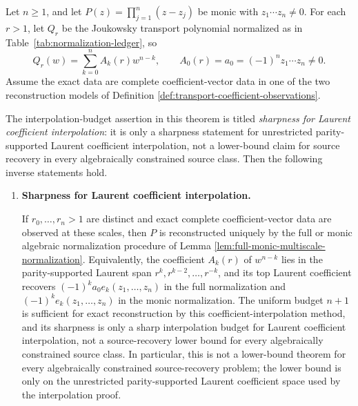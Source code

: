 \begin{theorem}\label{thm:algebraic-mahler-transport-inverse}
Let \(n\ge1\), and let \(P(z)=\prod_{j=1}^{n}(z-z_j)\) be monic with \(z_1\cdots z_n\ne0\).  For each \(r>1\), let \(Q_r\) be the Joukowsky transport polynomial normalized as in Table~\ref{tab:normalization-ledger}, so
\[
Q_r(w)=\sum_{k=0}^{n}A_k(r)w^{n-k},
\qquad
A_0(r)=a_0=(-1)^n z_1\cdots z_n\ne0.
\]
Assume the exact data are complete coefficient-vector data in one of the
two reconstruction models of Definition
\ref{def:transport-coefficient-observations}.

The interpolation-budget assertion in this theorem is titled
\emph{sharpness for Laurent coefficient interpolation}: it is only a
sharpness statement for unrestricted parity-supported Laurent coefficient
interpolation, not a lower-bound claim for source recovery in every
algebraically constrained source class.  Then the following inverse
statements hold.
\begin{enumerate}[label=\textup{(\roman*)}]
  \item \leavevmode\par\noindent\textbf{Sharpness for Laurent coefficient interpolation.}

  If \(r_0,\dots,r_n>1\) are distinct and exact complete coefficient-vector data are observed at these scales, then \(P\) is reconstructed uniquely by the full or monic algebraic normalization procedure of Lemma \ref{lem:full-monic-multiscale-normalization}.  Equivalently, the coefficient \(A_k(r)\) of \(w^{n-k}\) lies in the parity-supported Laurent span \(r^k,r^{k-2},\dots,r^{-k}\), and its top Laurent coefficient recovers \((-1)^ka_0e_k(z_1,\dots,z_n)\) in the full normalization and \((-1)^ke_k(z_1,\dots,z_n)\) in the monic normalization.  The uniform budget \(n+1\) is sufficient for exact reconstruction by this coefficient-interpolation method, and its sharpness is only a sharp interpolation budget for Laurent coefficient interpolation, not a source-recovery lower bound for every algebraically constrained source class.
  In particular, this is not a lower-bound theorem for every
  algebraically constrained source-recovery problem; the lower bound is
  only on the unrestricted parity-supported Laurent coefficient space
  used by the interpolation proof.


\end{enumerate}
\end{theorem}
